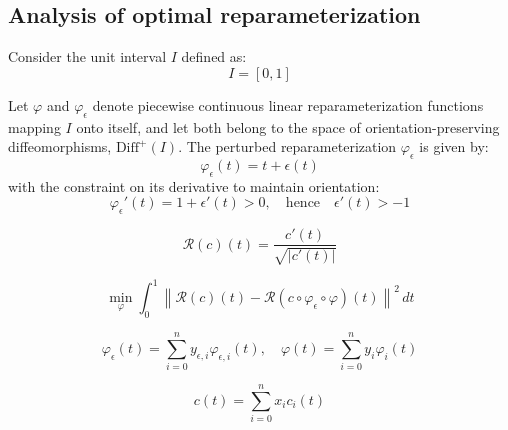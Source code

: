 \subsection{Analysis of optimal reparameterization}

Consider the unit interval \(I\) defined as:
\[
I = [0, 1]
\]

Let \(\varphi\) and \(\varphi_{\epsilon}\) denote piecewise continuous linear reparameterization functions mapping \(I\) onto itself, and let both belong to the space of orientation-preserving diffeomorphisms, \(\text{Diff}^+(I)\). The perturbed reparameterization \(\varphi_{\epsilon}\) is given by:
\[
\varphi_{\epsilon}(t) = t + \epsilon(t)
\]
with the constraint on its derivative to maintain orientation:
\[
\varphi_{\epsilon}'(t) = 1 + \epsilon'(t) > 0, \quad \text{hence} \quad \epsilon'(t) > -1
\]

\[
\mathcal{R}(c)(t) = \frac{c'(t)}{\sqrt{|c'(t)|}}
\]

\[
\min_{\varphi} \int_0^1 \left\| \mathcal{R}(c)(t) - \mathcal{R}(c \circ \varphi_{\epsilon} \circ \varphi)(t) \right\|^2 \, dt
\]

\[
\varphi_{\epsilon}(t) = \sum_{i = 0}^n y_{\epsilon, i} \varphi_{\epsilon, i}(t), \quad \varphi(t) = \sum_{i = 0}^n y_i \varphi_i(t)
\]

\[
c(t) = \sum_{i = 0}^n x_i c_i(t)
\]
